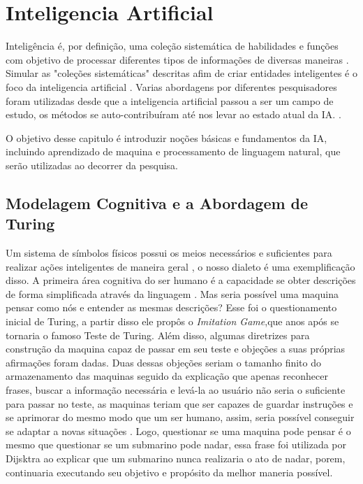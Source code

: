 \chapter{Inteligencia Artificial}
Inteligência é, por definição, uma coleção sistemática de habilidades e funções com objetivo de processar diferentes tipos de informações de diversas maneiras \cite[49]{guilford1982cognitive}. Simular as "coleções sistemáticas" descritas afim de criar entidades inteligentes é o foco da inteligencia artificial \cite[1]{russell2003artificial}. Varias abordagens por diferentes pesquisadores foram utilizadas desde que a inteligencia artificial passou a ser um campo de estudo, os métodos se auto-contribuíram até nos levar ao estado atual da IA. \cite[2]{russell2003artificial}.

O objetivo desse capitulo é introduzir noções básicas e fundamentos da IA, incluindo aprendizado de maquina e processamento de linguagem natural, que serão utilizadas ao decorrer da pesquisa.

\section{Modelagem Cognitiva e a Abordagem de Turing}
Um sistema de símbolos físicos possui os meios necessários e suficientes para realizar ações inteligentes de maneira geral \cite[116]{newell1976ComputerSA}, o nosso dialeto é uma exemplificação disso. A primeira área cognitiva do ser humano é a capacidade se obter descrições de forma simplificada através da linguagem \cite[131]{putnam1975mind}. Mas seria possível uma maquina pensar como nós e entender as mesmas descrições? Esse foi o questionamento inicial de Turing, a partir disso ele propôs o \textit{Imitation Game},que anos após se tornaria o famoso Teste de Turing. Além disso, algumas diretrizes para construção da maquina capaz de passar em seu teste e objeções a suas próprias afirmações foram dadas. Duas dessas objeções seriam o tamanho finito do armazenamento das maquinas seguido da explicação que apenas reconhecer frases, buscar a informação necessária e levá-la ao usuário não seria o suficiente para passar no teste, as maquinas teriam que ser capazes de guardar instruções e se aprimorar do mesmo modo que um ser humano, assim, seria possível conseguir se adaptar a novas situações \cite[144-155]{turing1950}. Logo, questionar se uma maquina pode pensar é o mesmo que questionar se um submarino pode nadar, essa frase foi utilizada por Dijsktra \cite{dijkstra898} ao explicar que um submarino nunca realizaria o ato de nadar, porem, continuaria executando seu objetivo e propósito da melhor maneria possível.


